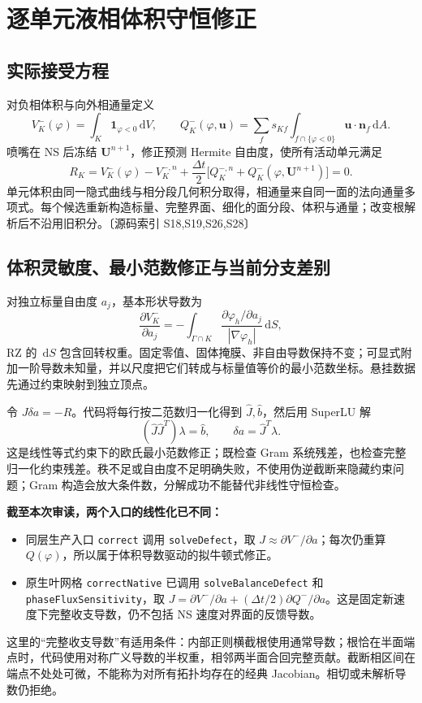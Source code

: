 \documentclass[UTF8,a4paper,11pt,fontset=fandol]{ctexart}
\newcommand{\code}[1]{\nolinkurl{#1}}
\newcommand{\src}[1]{\textcolor{ink}{\small〔源码索引 #1〕}}
\newcommand{\UU}{\bm{U}}
\newcommand{\vel}{\bm{u}}
\newcommand{\dd}{\,\mathrm{d}}
\newcommand{\dt}{\Delta t}
\begin{document}
\section{逐单元液相体积守恒修正}
\subsection{实际接受方程}
对负相体积与向外相通量定义
\begin{equation}
 V_K^-(\varphi)=\int_K\mathbf1_{\varphi<0}\dd V,\qquad
 Q_K^-(\varphi,\vel)=\sum_f s_{Kf}\int_{f\cap\{\varphi<0\}}\vel\cdot\bm n_f\dd A.
\end{equation}
喷嘴在 NS 后冻结 $\UU^{n+1}$，修正预测 Hermite 自由度，使所有活动单元满足
\begin{equation}
 R_K=V_K^-(\varphi)-V_K^{-,n}
   +\frac{\dt}{2}\big[Q_K^{-,n}+Q_K^-(\varphi,\UU^{n+1})\big]=0.\label{eq:volume}
\end{equation}
单元体积由同一隐式曲线与相分段几何积分取得，相通量来自同一面的法向通量多项式。每个候选重新构造标量、完整界面、细化的面分段、体积与通量；改变根解析后不沿用旧积分。\src{S18,S19,S26,S28}

\subsection{体积灵敏度、最小范数修正与当前分支差别}
对独立标量自由度 $a_j$，基本形状导数为
\begin{equation}
 \frac{\partial V_K^-}{\partial a_j}
 =-\int_{\Gamma\cap K}\frac{\partial\varphi_h/\partial a_j}{|\nabla\varphi_h|}\dd S,
\end{equation}
RZ 的 $\dd S$ 包含回转权重。固定零值、固体掩膜、非自由导数保持不变；可显式附加一阶导数未知量，并以尺度把它们转成与标量值等价的最小范数坐标。悬挂数据先通过约束映射到独立顶点。

令 $J\delta a=-R$。代码将每行按二范数归一化得到 $\widehat J,\widehat b$，然后用 SuperLU 解
\begin{equation}
 (\widehat J\widehat J^T)\lambda=\widehat b,
 \qquad\delta a=\widehat J^T\lambda.
\end{equation}
这是线性等式约束下的欧氏最小范数修正；既检查 Gram 系统残差，也检查完整归一化约束残差。秩不足或自由度不足明确失败，不使用伪逆截断来隐藏约束问题；Gram 构造会放大条件数，分解成功不能替代非线性守恒检查。

\textbf{截至本次审读，两个入口的线性化已不同：}
\begin{itemize}
\item 同层生产入口 \code{correct} 调用 \code{solveDefect}，取 $J\approx\partial V^-/\partial a$；每次仍重算 $Q(\varphi)$，所以属于体积导数驱动的拟牛顿式修正。
\item 原生叶网格 \code{correctNative} 已调用 \code{solveBalanceDefect} 和 \code{phaseFluxSensitivity}，取 $J=\partial V^-/\partial a+(\dt/2)\partial Q^-/\partial a$。这是固定新速度下完整收支导数，仍不包括 NS 速度对界面的反馈导数。
\end{itemize}
这里的“完整收支导数”有适用条件：内部正则横截根使用通常导数；根恰在半面端点时，代码使用对称广义导数的半权重，相邻两半面合回完整贡献。截断相区间在端点不处处可微，不能称为对所有拓扑均存在的经典 Jacobian。相切或未解析导数仍拒绝。
\end{document}
